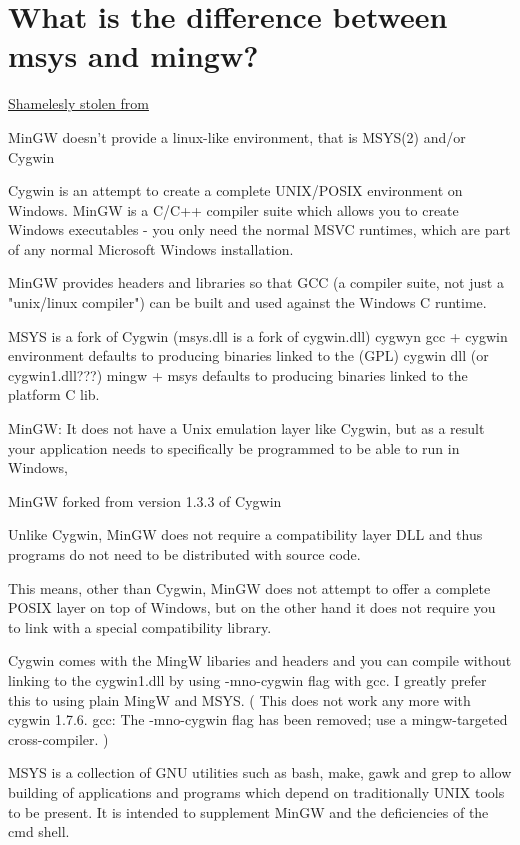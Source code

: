 \documentclass[../LabBook]{subfiles}
\begin{document}
    \section{What is the difference between msys and mingw?}
    \href{https://gist.github.com/ReneNyffenegger/a8e9aa59166760c5550f993857ee437d}{Shamelesly stolen from}

    MinGW doesn't provide a linux-like environment, that is MSYS(2) and/or Cygwin

    Cygwin is an attempt to create a complete UNIX/POSIX environment on Windows.
    MinGW is a C/C++ compiler suite which allows you to create Windows executables - you only
    need the normal MSVC runtimes, which are part of any normal Microsoft Windows installation.

    MinGW provides headers and libraries so that GCC (a compiler suite,
    not just a "unix/linux compiler") can be built and used against the Windows C runtime.


    MSYS is a fork of Cygwin (msys.dll is a fork of cygwin.dll)
    cygwyn gcc + cygwin environment defaults to producing
    binaries linked to the (GPL) cygwin dll (or cygwin1.dll???)
    mingw + msys defaults to producing binaries linked to the platform C lib.

    MinGW: It does not have a Unix emulation layer like Cygwin, but as a
    result your application needs to specifically be programmed to be able to run in Windows,

    MinGW forked from version 1.3.3 of Cygwin

    Unlike Cygwin, MinGW does not require a compatibility layer DLL and thus programs do not need to be distributed with source code.

    This means, other than Cygwin, MinGW does not attempt to offer a complete POSIX layer on top of Windows,
    but on the other hand it does not require you to link with a special compatibility library.

    Cygwin comes with the MingW libaries and headers and you can compile without linking to the cygwin1.dll by
    using -mno-cygwin flag with gcc. I greatly prefer this to using plain MingW and MSYS.
    (  This does not work any more with cygwin 1.7.6. gcc: The -mno-cygwin flag has been removed; use a mingw-targeted cross-compiler. )

    MSYS is a collection of GNU utilities such as bash, make, gawk and grep to allow building of applications and programs
    which depend on traditionally UNIX tools to be present.
    It is intended to supplement MinGW and the deficiencies of the cmd shell.
\end{document}

